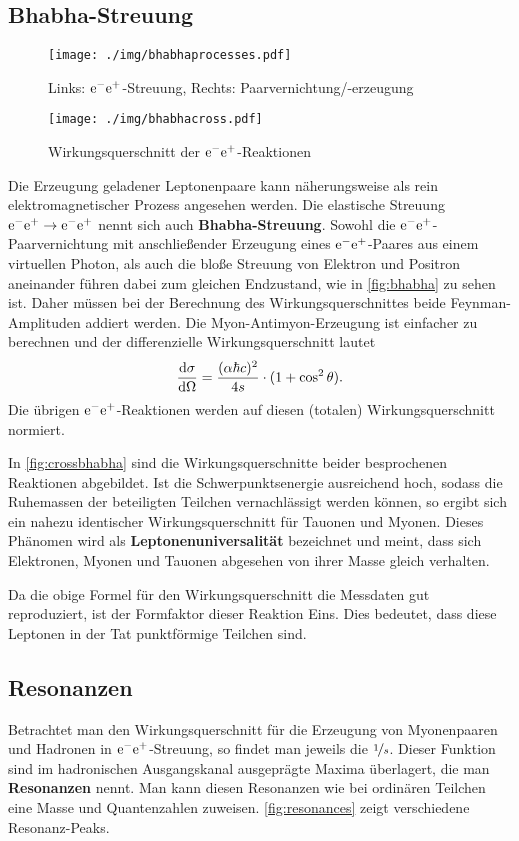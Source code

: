 \subsection{Bhabha-Streuung}
\begin{figure}
	\centering
	\texttt{[image: ./img/bhabhaprocesses.pdf]}
	\caption{Links: $\el\pos$-Streuung, Rechts: Paarvernichtung/-erzeugung}
	\label{fig:bhabha}
\end{figure}
\begin{figure}
	\centering
	\texttt{[image: ./img/bhabhacross.pdf]}
	\caption{Wirkungsquerschnitt der $\el\pos$-Reaktionen}
	\label{fig:crossbhabha}
\end{figure}
Die Erzeugung geladener Leptonenpaare kann näherungsweise als rein elektromagnetischer Prozess angesehen werden.
Die elastische Streuung $\el\pos\rightarrow\el\pos$ nennt sich auch \textbf{Bhabha-Streuung}.
Sowohl die $\el\pos$-Paarvernichtung mit anschließender Erzeugung eines $\el\pos$-Paares aus einem virtuellen Photon, als auch die bloße Streuung von Elektron und Positron aneinander führen dabei zum gleichen Endzustand, wie in \autoref{fig:bhabha} zu sehen ist.
Daher müssen bei der Berechnung des Wirkungsquerschnittes beide Feynman-Amplituden addiert werden.
Die Myon-Antimyon-Erzeugung ist einfacher zu berechnen und der differenzielle Wirkungsquerschnitt lautet
\begin{equation*}
	\diff[\sigma]{\Omega} = \frac{(\alpha\hbar c)^2}{4s}\cdot(1+\cos^2\theta).
\end{equation*}
Die übrigen $\el\pos$-Reaktionen werden auf diesen (totalen) Wirkungsquerschnitt normiert.

In \autoref{fig:crossbhabha} sind die Wirkungsquerschnitte beider besprochenen Reaktionen abgebildet.
Ist die Schwerpunktsenergie ausreichend hoch, sodass die Ruhemassen der beteiligten Teilchen vernachlässigt werden können, so ergibt sich ein nahezu identischer Wirkungsquerschnitt für Tauonen und Myonen.
Dieses Phänomen wird als \textbf{Leptonenuniversalität} bezeichnet und meint, dass sich Elektronen, Myonen und Tauonen abgesehen von ihrer Masse gleich verhalten.

Da die obige Formel für den Wirkungsquerschnitt die Messdaten gut reproduziert, ist der Formfaktor dieser Reaktion Eins.
Dies bedeutet, dass diese Leptonen in der Tat punktförmige Teilchen sind.

\subsection{Resonanzen}
Betrachtet man den Wirkungsquerschnitt für die Erzeugung von Myonenpaaren und Hadronen in $\el\pos$-Streuung, so findet man jeweils die $\nicefrac{1}{s}$.
Dieser Funktion sind im hadronischen Ausgangskanal ausgeprägte Maxima überlagert, die man \textbf{Resonanzen} nennt.
Man kann diesen Resonanzen wie bei ordinären Teilchen eine Masse und Quantenzahlen zuweisen.
\autoref{fig:resonances} zeigt verschiedene Resonanz-Peaks.

